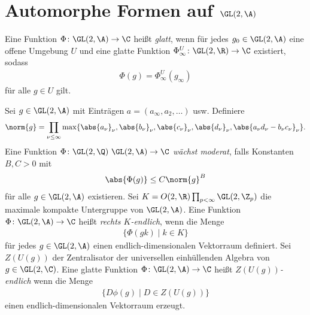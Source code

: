 \chapter{Automorphe Formen auf $\GL(2,\A)$}

\begin{defi}
Eine Funktion $\Phi \colon \GL(2,\A) \to \C$ heißt \emph{glatt},
wenn für jedes $g_0 \in \GL(2,\A)$ eine offene Umgebung $U$ und eine
glatte Funktion $\Phi_\infty^U \colon \GL(2,\R) \to \C$ existiert, sodass
\begin{align*}
\Phi(g)=\Phi_\infty^U(g_\infty)
\end{align*}
für alle $g \in U$ gilt.
\end{defi}

\begin{defi}
Sei $g \in \GL(2,\A)$ mit Einträgen $a=(a_\infty,a_2,\dots)$ usw.
Definiere
\begin{align*}
\norm{g}=\prod_{\nu \leq \infty} \max\{\abs{a_\nu}_\nu, \abs{b_\nu}_\nu, \abs{c_\nu}_\nu, \abs{d_\nu}_\nu, \abs{a_\nu d_\nu-b_\nu c_\nu}_\nu\}.
\end{align*}
Eine Funktion $\Phi \colon  \GL(2,\Q)\ \GL(2,\A) \to \C$ \emph{wächst moderat}, falls Konstanten $B,C>0$ mit
\begin{align*}
\abs{\Phi(g)} \leq C \norm{g}^B
\end{align*}
für alle $g \in \GL(2,\A)$ existieren.
Sei $K=O(2,\R) \prod_{p<\infty} \GL(2,\Z_p)$
die maximale kompakte Untergruppe von $\GL(2,\A)$.
Eine Funktion $\Phi \colon \GL(2,\A)\to \C$
heißt \emph{rechts $K$-endlich}, wenn die Menge
\begin{align*}
\{\Phi(gk)\mid k\in K\}
\end{align*}
für jedes $g \in \GL(2,\A)$ einen endlich-dimensionalen Vektorraum definiert.
Sei $Z(U(g))$ der Zentralisator der universellen einhüllenden Algebra von $g \in \GL(2,\C)$.
Eine glatte Funktion $\Phi \colon \GL(2,\A) \to \C$ heißt
\emph{$Z(U(g))$-endlich} wenn die Menge
\begin{align*}
\{D \phi(g)\mid D\in Z(U(g))\}
\end{align*}
einen endlich-dimensionalen Vektorraum erzeugt.
\end{defi}

